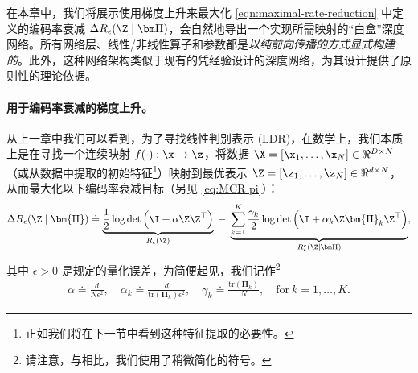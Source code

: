 \documentclass[../../book-main_zh.tex]{subfiles}
\begin{document}
在本章中，我们将展示使用梯度上升来最大化 \eqref{eqn:maximal-rate-reduction} 中定义的编码率衰减 $\Delta R_{\epsilon}(\Z \mid \bm \Pi)$，会自然地导出一个实现所需映射的“白盒”深度网络。所有网络层、线性/非线性算子和参数都是{\em 以纯前向传播的方式显式构建的}。此外，这种网络架构类似于现有的凭经验设计的深度网络，为其设计提供了原则性的理论依据。

\paragraph{用于编码率衰减的梯度上升。} 从上一章中我们可以看到，为了寻找线性判别表示 (LDR)，在数学上，我们本质上是在寻找一个连续映射 $f(\cdot): \x \mapsto \z$，将数据 $\X = [\x_1, \ldots, \x_N] \in \Re^{D \times N}$（或从数据中提取的初始特征\footnote{正如我们将在下一节中看到这种特征提取的必要性。}）映射到最优表示 $\Z = [\z_1, \ldots, \z_N] \in \Re^{d \times N}$，从而最大化以下编码率衰减目标（另见 \eqref{eq:MCR pi}）：
\begin{equation}\label{eq:mcr-formulation}
    \begin{split}
        \Delta R_{\epsilon}(\Z \mid \bm{\Pi}) \doteq
        \underbrace{\frac{1}{2}\log\det \Big(\I + {\alpha} \Z
        \Z^{\top} \Big)}_{R_{\epsilon}(\Z)} \;-\;
        \underbrace{\sum_{k=1}^{K}\frac{\gamma_{k}}{2}
            \log\det\Big(\I + {\alpha_{k}} \Z \bm{\Pi}_{k} \Z^{\top}
        \Big)}_{R_{\epsilon}^c(\Z \mid \bm \Pi)},
    \end{split}
\end{equation}
其中 $\epsilon > 0$ 是规定的量化误差，为简便起见，我们记作\footnote{请注意，与相比，我们使用了稍微简化的符号。}
\begin{align*}
    \alpha \doteq \frac{d}{N\epsilon^2}, \quad \alpha_{k} \doteq
    \frac{d}{\mathrm{tr}(\bm{\Pi}_{k})\epsilon^2}, \quad \gamma_{k}
    \doteq \frac{\mathrm{tr}(\bm{\Pi}_{k})}{N}, \quad \text{for}\ k
    = 1,\ldots, K.
\end{align*}
\end{document}
